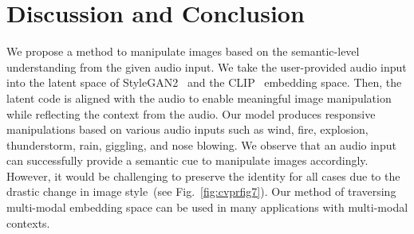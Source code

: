 \documentclass[10pt,twocolumn,letterpaper]{article}
\begin{document}
\section{Discussion and Conclusion}
We propose a method to manipulate images based on the semantic-level understanding from the given audio input. %
We take the user-provided audio input into the latent space of StyleGAN2~\cite{karras2020analyzing} and the CLIP~\cite{radford2learning} embedding space. Then, the latent code is aligned with the audio to enable meaningful image manipulation while reflecting the context from the audio. 
Our model produces responsive manipulations based on various audio inputs such as wind, fire, explosion, thunderstorm, rain, giggling, and nose blowing. We observe that an audio input can successfully provide a semantic cue to manipulate images accordingly. However, it would be challenging to preserve the identity for all cases due to the drastic change in image style~(see Fig.~\ref{fig:cvprfig7}).
Our method of traversing multi-modal embedding space can be used in many applications with multi-modal contexts.




\newpage
{
\small


}
\end{document}
